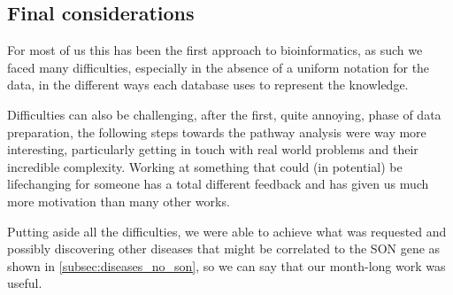 \subsection{Final considerations}\label{subsec:final_considerations}
For most of us this has been the first approach to bioinformatics, as such we faced many difficulties, especially in the absence of a uniform notation for the data, in the different ways each database uses to represent the knowledge. 
\vspace{3mm}

Difficulties can also be challenging, after the first, quite annoying, phase of data preparation, the following steps towards the pathway analysis were way more interesting, particularly getting in touch with real world problems and their incredible complexity. Working at something that could (in potential) be lifechanging for someone has a total different feedback and has given us much more motivation than many other works.
\vspace{3mm}

Putting aside all the difficulties, we were able to achieve what was requested and possibly discovering other diseases that might be correlated to the SON gene as shown in \autoref{subsec:diseases_no_son}, so we can say that our month-long work was useful.
